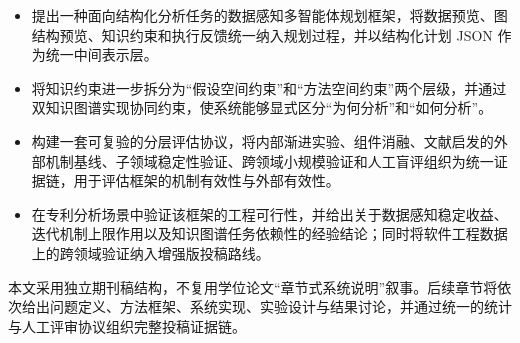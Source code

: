 \begin{itemize}
  \item 提出一种面向结构化分析任务的数据感知多智能体规划框架，将数据预览、图结构预览、知识约束和执行反馈统一纳入规划过程，并以结构化计划 JSON 作为统一中间表示层。
  \item 将知识约束进一步拆分为“假设空间约束”和“方法空间约束”两个层级，并通过双知识图谱实现协同约束，使系统能够显式区分“为何分析”和“如何分析”。
  \item 构建一套可复验的分层评估协议，将内部渐进实验、组件消融、文献启发的外部机制基线、子领域稳定性验证、跨领域小规模验证和人工盲评组织为统一证据链，用于评估框架的机制有效性与外部有效性。
  \item 在专利分析场景中验证该框架的工程可行性，并给出关于数据感知稳定收益、迭代机制上限作用以及知识图谱任务依赖性的经验结论；同时将软件工程数据上的跨领域验证纳入增强版投稿路线。
\end{itemize}

本文采用独立期刊稿结构，不复用学位论文“章节式系统说明”叙事。后续章节将依次给出问题定义、方法框架、系统实现、实验设计与结果讨论，并通过统一的统计与人工评审协议组织完整投稿证据链。
